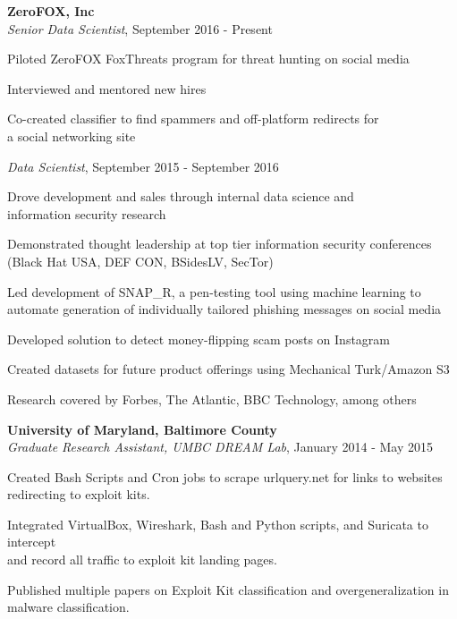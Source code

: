 \medskip
\atab \textbf{ZeroFOX, Inc}\\
\btab \textit{Senior Data Scientist}, September 2016 - Present\\
\begin{my_list}
\item Piloted ZeroFOX FoxThreats program for threat hunting on social media
\item Interviewed and mentored new hires
\item Co-created classifier to find spammers and off-platform redirects for\\ \tab \tab a social networking site
\end{my_list}
\btab \textit{Data Scientist}, September 2015 - September 2016\\
\begin{my_list}
\item Drove development and sales through internal data science and\\ \tab \tab information security research
\item Demonstrated thought leadership at top tier information security conferences\\ \tab \tab (Black Hat USA, DEF CON, BSidesLV, SecTor)
\item Led development of SNAP\_R, a pen-testing tool using machine learning to\\ \tab \tab automate generation of individually tailored phishing messages on social media
\item Developed solution to detect money-flipping scam posts on Instagram
\item Created datasets for future product offerings using Mechanical Turk/Amazon S3 
\item Research covered by Forbes, The Atlantic, BBC Technology, among others
\end{my_list}

\medskip
\atab \textbf{University of Maryland, Baltimore County}\\
\btab \textit{Graduate Research Assistant, UMBC DREAM Lab}, January 2014 - May 2015\\
\begin{my_list}
\item Created Bash Scripts and Cron jobs to scrape urlquery.net for links to websites\\ \tab \tab redirecting to exploit kits.
\item Integrated VirtualBox, Wireshark, Bash and Python scripts, and Suricata to intercept\\ \tab \tab and record all traffic to exploit kit landing pages.
\item Published multiple papers on Exploit Kit classification and overgeneralization in\\ \tab \tab malware classification.
\end{my_list}

